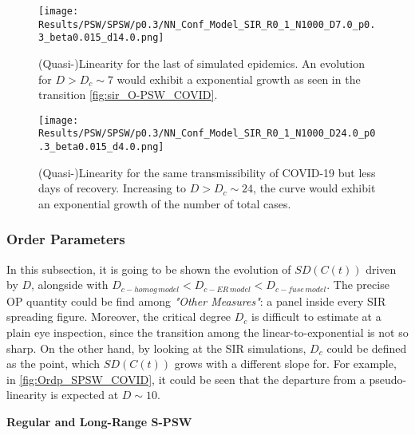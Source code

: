 \documentclass[a4paper,10pt,twoside]{book} %
\theoremstyle{definition}
\begin{document}
\begin{figure}[h]
		\texttt{[image: Results/PSW/SPSW/p0.3/NN\_Conf\_Model\_SIR\_R0\_1\_N1000\_D7.0\_p0.3\_beta0.015\_d14.0.png]}
	\caption{(Quasi-)Linearity for the last of simulated epidemics. An evolution for $D > D_c \sim 7$ would exhibit a exponential growth as seen in the transition \autoref{fig:sir_O-PSW_COVID}.}
	\label{fig:sir_SPSW_p0.3_D7}
\end{figure}

\begin{figure}[h]
	\texttt{[image: Results/PSW/SPSW/p0.3/NN\_Conf\_Model\_SIR\_R0\_1\_N1000\_D24.0\_p0.3\_beta0.015\_d4.0.png]}
\caption{(Quasi-)Linearity for the same transmissibility of COVID-19 but less days of recovery. Increasing to $D > D_c \sim 24$, the curve would exhibit an exponential growth of the number of total cases.}
\label{fig:sir_SPSW_p0.3_D24}
\end{figure}


\newpage
\subsubsection*{Order Parameters}
In this subsection, it is going to be shown the evolution of $SD(C(t))$ driven by $D$, alongside with $D_{c-homog \, model} < D_{c-ER \, model} < D_{c-fuse \, model}$. The precise OP quantity could be find among \textit{"Other Measures"}: a panel inside every SIR spreading figure. Moreover, the critical degree $D_c$ is difficult to estimate at a plain eye inspection, since the transition among the linear-to-exponential is not so sharp. On the other hand, by looking at the SIR simulations, $D_c$ could be defined as the point, which $SD(C(t))$ grows with a different slope for.
For example, in \autoref{fig:Ordp_SPSW_COVID}, it could be seen that the departure from a pseudo-linearity is expected at $D \sim 10$.

\textbf{Regular and Long-Range S-PSW}
\end{document}
